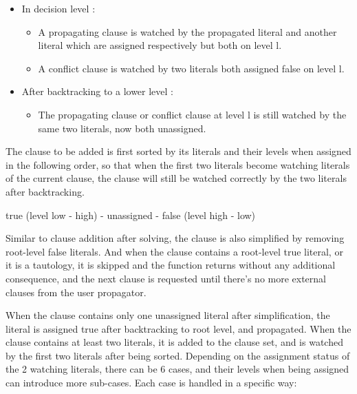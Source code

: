\begin{itemize}
  \item In decision level :
  \begin{itemize}
    \item A propagating clause is watched by the propagated literal and another literal which are assigned  respectively but both on level l.
    \item A conflict clause is watched by two literals both assigned false on level l.
  \end{itemize}
  \item After backtracking to a lower level :
  \begin{itemize}
    \item The propagating clause or conflict clause at level l is still watched by the same two literals, now both unassigned.
  \end{itemize}
\end{itemize}

The clause to be added is first sorted by its literals and their levels when assigned in the following order, so that when the first two literals become watching literals of the current clause, the clause will still be watched correctly by the two literals after backtracking.

\begin{center}
  true (level low - high) - unassigned - false (level high - low)
\end{center}

Similar to clause addition after solving, the clause is also simplified by removing root-level false literals. And when the clause contains a root-level true literal, or it is a tautology, it is skipped and the function returns without any additional consequence, and the next clause is requested until there's no more external clauses from the user propagator.

When the clause contains only one unassigned literal after simplification, the literal is assigned true after backtracking to root level, and propagated. When the clause contains at least two literals, it is added to the clause set, and is watched by the first two literals after being sorted. Depending on the assignment status of the 2 watching literals, there can be 6 cases, and their levels when being assigned can introduce more sub-cases. Each case is handled in a specific way:

